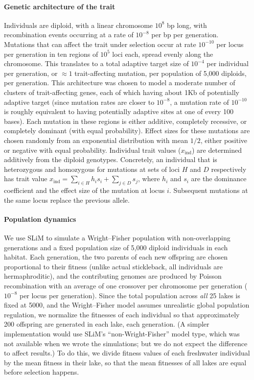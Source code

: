 \documentclass{article}
\begin{document}
\paragraph{Genetic architecture of the trait}

Individuals are diploid, with a linear chromosome $10^8$ bp long,
with recombination events occurring at a rate of $10^{-8}$ per bp per generation. 
Mutations that can affect the trait under selection occur at rate $10^{-10}$ per locus per generation
in ten regions of $10^5$ loci each, spread evenly along the chromosome.
This translates to a total adaptive target size of $10^{-4}$ per individual per generation, 
or $\approx 1$ trait-affecting mutation, per population of 5,000 diploids, per generation.
This architecture was chosen to model a moderate number of clusters of trait-affecting genes,
each of which having about 1Kb of potentially adaptive target
(since mutation rates are closer to $10^{-8}$, a mutation rate of $10^{-10}$
is roughly equivalent to having potentially adaptive sites at one of every 100 bases).
Each mutation in these regions is either additive, completely recessive, or completely dominant (with equal probability). 
Effect sizes for these mutations are chosen randomly from an exponential distribution with mean $1/2$, either positive or negative with equal probability. 
Individual trait values ($x_\text{ind}$) are determined additively from the diploid genotypes. 
Concretely, an individual that is heterozygous and homozygous for mutations at sets of loci $H$ and $D$ respectively has trait value $x_\text{ind} = \sum_{i \in H} h_i s_i + \sum_{j \in D} s_j$, where $h_i$ and $s_i$ are the dominance coefficient and the effect size of the mutation at locus $i$. Subsequent mutations at the same locus replace the previous allele. 

\paragraph{Population dynamics}

We use SLiM to simulate a Wright--Fisher population with non-overlapping generations 
and a fixed population size of 5,000 diploid individuals in each habitat. 
Each generation, the two parents of each new offspring are chosen proportional to their fitness 
(unlike actual stickleback, all individuals are hermaphroditic), and the contributing genomes are produced by Poisson recombination with an average of one crossover per chromosome per generation ($10^{-8}$ per locus per generation). 
Since the total population across \emph{all} 25 lakes is fixed at 5000, and the Wright--Fisher model assumes unrealistic global population regulation, we normalize the fitnesses of each individual so that approximately 200 offspring are generated in each lake, each generation. 
(A simpler implementation would use SLiM's ``non-Wright-Fisher'' model type, 
which was not available when we wrote the simulations; but we do not expect the difference to affect results.) 
To do this, we divide fitness values of each freshwater individual by the mean fitness in their lake, so that the mean fitnesses of all lakes are equal before selection happens.
\end{document}

